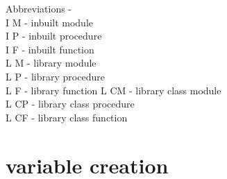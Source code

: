 \pagebreak

Abbreviations - \\
I M - inbuilt module \\
I P - inbuilt procedure \\
I F - inbuilt function \\
L M - library module \\
L P - library procedure \\
L F - library function
L CM - library class module\\
L CP - library class procedure\\
L CF - library class function\\


\section{variable creation}

